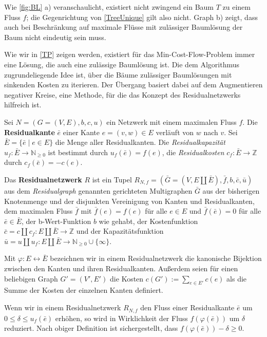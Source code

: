 Wie \cref{fig:BL} a) veranschaulicht, existiert nicht zwingend ein Baum $T$ zu einem Fluss $f$; die Gegenrichtung von \cref{TreeUnique} gilt also nicht. Graph b) zeigt, dass auch bei Beschränkung auf maximale Flüsse mit zulässiger Baumlösung der Baum nicht eindeutig sein muss.

Wie wir in \cref{TP} zeigen werden, existiert für das Min-Cost-Flow-Problem immer eine Lösung, die auch eine zulässige Baumlösung ist. Die dem Algorithmus zugrundeliegende Idee ist, über die Bäume zulässiger Baumlösungen mit sinkenden Kosten zu iterieren. Der Übergang basiert dabei auf dem Augmentieren negativer Kreise, eine Methode, für die das Konzept des Residualnetzwerks hilfreich ist.

\begin{defn}\label{defRes}Sei $N=(G=(V,E),b,c,u)$ ein Netzwerk mit einem maximalen Fluss $f$. Die \textbf{Residualkante} $\bar{e}$ einer Kante $e=(v,w)\in E$ verläuft von $w$ nach $v$. Sei $\bar{E}=\{\bar{e}\mid e\in E\}$ die Menge aller Residualkanten. Die \textit{Residualkapazität} $u_f\colon\bar{E}\rightarrow\mathbb{N}_{\geq0}$ ist bestimmt durch $u_f(\bar{e})=f(e)$, die \textit{Residualkosten} $c_f\colon\bar{E}\rightarrow\mathbb{Z}$ durch $c_f(\bar{e})=-c(e)$.

Das \textbf{Residualnetzwerk} $R$ ist ein Tupel $R_{N,f}=(\bar{G}=(V,E\amalg\bar{E}),\bar{f},b,\bar{c},\bar{u})$ aus dem \emph{Residualgraph} genannten gerichteten Multigraphen $\bar{G}$ aus der bisherigen Knotenmenge und der disjunkten Vereinigung von Kanten und Residualkanten, dem maximalen Fluss $\bar{f}$ mit $\bar{f}(e)=f(e)$ für alle $e\in E$ und $\bar{f}(\bar{e})=0$ für alle $\bar{e}\in\bar{E}$, der b-Wert-Funktion $b$ wie gehabt, der Kostenfunktion $\bar{c}=c\amalg c_f\colon E\amalg\bar{E}\rightarrow\mathbb{Z}$ und der Kapazitätsfunktion $\bar{u}=u\amalg u_f\colon E\amalg\bar{E}\rightarrow\mathbb{N}_{\geq0}\cup \{\infty\}$.\end{defn}

\begin{nota}Mit $\varphi\colon E\leftrightarrow\bar{E}$ bezeichnen wir in einem Residualnetzwerk die kanonische Bijektion zwischen den Kanten und ihren Residualkanten. Außerdem seien für einen beliebigen Graph $G'=(V',E')$ die Kosten $c(G'):=\sum_{e\in E'} c(e)$ als die Summe der Kosten der einzelnen Kanten definiert.\end{nota}

Wenn wir in einem Residualnetzwerk $R_{N,f}$ den Fluss einer Residualkante $\bar{e}$ um $0\leq\delta\leq u_f(\bar{e})$ erhöhen, so wird in Wirklichkeit der Fluss $f(\varphi(\bar{e}))$ um $\delta$ reduziert. Nach obiger Definition ist sichergestellt, dass $f(\varphi(\bar{e}))-\delta\geq0$.

